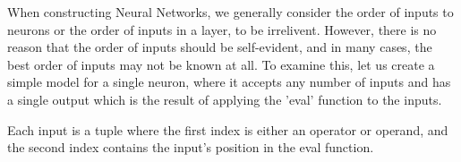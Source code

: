 \documentclass[./Research.tex]{subfiles}
\begin{document}
\def\layersep{2.5cm}

	When constructing Neural Networks, we generally consider the order of inputs to neurons or the order of inputs in a layer, to be irrelivent. However, there is no reason that the order of inputs should be self-evident, and in many cases, the best order of inputs may not be known at all. To examine this, let us create a simple model for a single neuron, where it accepts any number of inputs and has a single output which is the result of applying the 'eval' function to the inputs. 

	
	Each input is a tuple where the first index is either an operator or operand, and the second index contains the input's position in the eval function.
	
\end{document}
